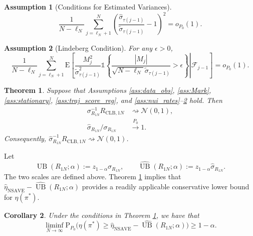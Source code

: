 \documentclass[12pt]{article}
\newtheorem{theorem}{Theorem}[section]
\newtheorem{corollary}[theorem]{Corollary}
\newtheorem{assumption}{Assumption}
\theoremstyle{remark}\newtheorem{remark}[theorem]{Remark}\theoremstyle{plain}
\newcommand{\E}{\mathrm{E}}
\newcommand{\pr}{\mathrm{P}}
\newcommand{\UB}{\operatorname{UB}}
\begin{document}
\begin{assumption}[Conditions for Estimated Variances]\label{ass:est_var}
    \[
        \frac{1}{N-\ell_N}
        \sum_{j=\ell_N+1}^N
        \left(
        \frac{\widehat\sigma_{\tau(j-1)}}
        {\widetilde\sigma_{\tau(j-1)}}-1
        \right)^2
        =o_{P_0}(1).
    \]
\end{assumption}

\begin{assumption}[Lindeberg Condition]\label{ass:Lindeberg}
    For any $\epsilon > 0$,
    \[
        \frac{1}{N-\ell_N}
        \sum_{j=\ell_N+1}^N
        \E\!\left[
        \left.
        \frac{M_j^2}{\widetilde\sigma_{\tau(j-1)}^2}
        \mathds{1}\!\left\{
        \frac{|M_j|}
        {\sqrt{N-\ell_N}\widetilde\sigma_{\tau(j-1)}}
        >\epsilon\right\}
        \right|\mathcal F_{j-1}\right]
        =o_{P_0}(1).
    \]
\end{assumption}


\begin{theorem}\label{thm:CLT_for_R1_CLB}
    Suppose that Assumptions \ref{ass:data_obs},
    \ref{ass:Mark}, \ref{ass:stationary},
    \ref{ass:traj_score_reg}, and
    \ref{ass:nui_rates}--\ref{ass:Lindeberg} hold. Then
    \[
        \begin{aligned}
            \sigma_{R_{1N}}^{-1} R_{\text{CLB}, 1N}
            &\rightsquigarrow \mathcal{N}(0,1),\\
            \widehat\sigma_{R_{1N}}/\sigma_{R_{1N}}
            &\overset{P_0}{\to}1.
        \end{aligned}
    \]
    Consequently,
    $\widehat\sigma_{R_{1N}}^{-1}R_{\text{CLB},1N}
    \rightsquigarrow\mathcal N(0,1)$.
\end{theorem}


Let
\[
    {\UB}(R_{1N};\alpha)
    :=z_{1-\alpha}\sigma_{R_{1N}},
    \qquad
    \widehat{\UB}(R_{1N};\alpha)
    :=z_{1-\alpha}\widehat\sigma_{R_{1N}}.
\]
The two scales are defined above.  Theorem
\ref{thm:CLT_for_R1_CLB} implies that
$\widehat{\eta}_{\text{NSAVE}}-\widehat{\UB}(R_{1N};\alpha)$
provides a readily applicable conservative lower bound for
$\eta(\pi^*)$.

\begin{corollary}\label{cor:lower_bound_method}
    Under the conditions in Theorem \ref{thm:CLT_for_R1_CLB}, we have that 
    \[
        \liminf_{N \rightarrow \infty} \pr_{P_0} \Big( \eta(\pi^*) \geq \widehat{\eta}_{\text{NSAVE}} - \widehat{\UB}(R_{1N}; \alpha) \Big) \geq 1 - \alpha.
    \]
\end{corollary}
\end{document}
